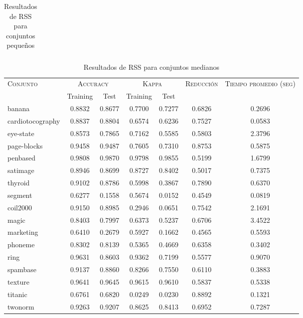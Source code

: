\begin{table}[]
\begin{tabular}{l c c c c c c}
\hline
\end{tabular}
\caption{Resultados de RSS para conjuntos pequeños }
\label{res-peq-RSS}
\end{table}

\begin{table}[]
\centering
\begin{tabular}{l c c c c c c}
\hline
\multirow{2}{*}{\textsc{Conjunto}}
	& \multicolumn{2}{c}{\textsc{Accuracy}}
	& \multicolumn{2}{c}{\textsc{Kappa}}
	& \textsc{Reducción}
	& \textsc{Tiempo promedio (seg)} \\
	& Training & Test
	& Training & Test \\ 
\hline
\hline

banana & 0.8832 & 0.8677 & 0.7700 & 0.7277 & 0.6826 & 0.2696 \\
cardiotocography & 0.8837 & 0.8804 & 0.6574 & 0.6236 & 0.7527 & 0.0583 \\
eye-state & 0.8573 & 0.7865 & 0.7162 & 0.5585 & 0.5803 & 2.3796 \\
page-blocks & 0.9458 & 0.9487 & 0.7605 & 0.7310 & 0.8753 & 0.5875 \\
penbased & 0.9808 & 0.9870 & 0.9798 & 0.9855 & 0.5199 & 1.6799 \\
satimage & 0.8946 & 0.8699 & 0.8727 & 0.8402 & 0.5017 & 0.7375 \\
thyroid & 0.9102 & 0.8786 & 0.5998 & 0.3867 & 0.7890 & 0.6370 \\
segment & 0.6277 & 0.1558 & 0.5674 & 0.0152 & 0.4549 & 0.0819 \\
coil2000 & 0.9150 & 0.8985 & 0.2946 & 0.0651 & 0.7542 & 2.1691 \\
magic & 0.8403 & 0.7997 & 0.6373 & 0.5237 & 0.6706 & 3.4522 \\
marketing & 0.6410 & 0.2679 & 0.5927 & 0.1662 & 0.4565 & 0.5593 \\
phoneme & 0.8302 & 0.8139 & 0.5365 & 0.4669 & 0.6358 & 0.3402 \\
ring & 0.9631 & 0.8603 & 0.9362 & 0.7199 & 0.5577 & 0.9070 \\
spambase & 0.9137 & 0.8860 & 0.8266 & 0.7550 & 0.6110 & 0.3883 \\
texture & 0.9641 & 0.9645 & 0.9615 & 0.9610 & 0.5837 & 0.5338 \\
titanic & 0.6761 & 0.6820 & 0.0249 & 0.0230 & 0.8892 & 0.1321 \\
twonorm & 0.9263 & 0.9207 & 0.8625 & 0.8413 & 0.6952 & 0.7287 \\

\hline
\end{tabular}
\caption{Resultados de RSS para conjuntos medianos }
\label{res-med-RSS}
\end{table}

